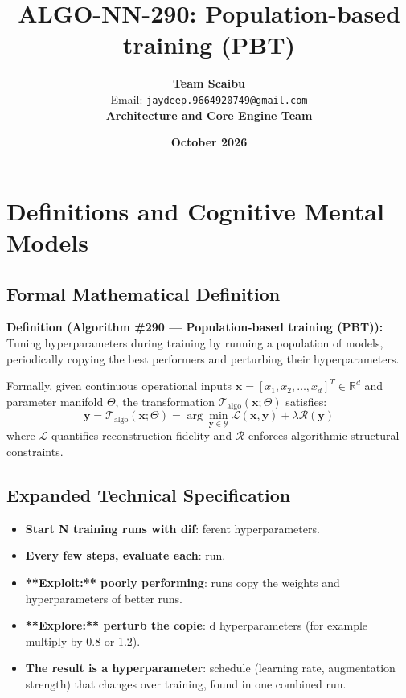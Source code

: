\documentclass[11pt,a4paper]{article}
\title{\textbf{ALGO-NN-290: Population-based training (PBT)}}
\author{\textbf{Team Scaibu} \\ \small Email: \texttt{jaydeep.9664920749@gmail.com} \\ \small \textbf{Architecture and Core Engine Team}}
\date{\textbf{October 2026}}
\theoremstyle{definition}
\begin{document}
\maketitle

\section{Definitions and Cognitive Mental Models}

\subsection{Formal Mathematical Definition}
\textbf{Definition (Algorithm \#290 --- Population-based training (PBT)):}
Tuning hyperparameters during training by running a population of models, periodically copying the best performers and perturbing their hyperparameters.

Formally, given continuous operational inputs $\mathbf{x} = [x_1, x_2, \dots, x_d]^T \in \mathbb{R}^d$ and parameter manifold $\Theta$, the transformation $\mathcal{T}_{\text{algo}}(\mathbf{x}; \Theta)$ satisfies:
{\boldmath
\begin{equation}
\mathbf{y} = \mathcal{T}_{\text{algo}}(\mathbf{x}; \Theta) = \arg\min_{\mathbf{y} \in \mathcal{Y}} \mathcal{L}(\mathbf{x}, \mathbf{y}) + \lambda \mathcal{R}(\mathbf{y})
\end{equation}
}
where $\mathcal{L}$ quantifies reconstruction fidelity and $\mathcal{R}$ enforces algorithmic structural constraints.

\subsection{Expanded Technical Specification}
\begin{itemize}
\item \textbf{Start N training runs with dif}: ferent hyperparameters.
\item \textbf{Every few steps, evaluate each}:  run.
\item \textbf{**Exploit:** poorly performing}:  runs copy the weights and hyperparameters of better runs.
\item \textbf{**Explore:** perturb the copie}: d hyperparameters (for example multiply by 0.8 or 1.2).
\item \textbf{The result is a hyperparameter}:  schedule (learning rate, augmentation strength) that changes over training, found in one combined run.
\end{itemize}
\end{document}
